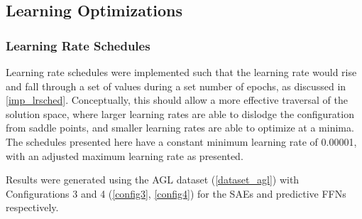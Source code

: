 \documentclass[a4paper,latin]{paper}
\begin{document}



\subsection{Learning Optimizations}

\subsubsection{Learning Rate Schedules}

Learning rate schedules were implemented such that the learning rate would rise and fall through a set of values during a set number of epochs, as discussed in \ref{imp_lrsched}.	Conceptually, this should allow a more effective traversal of the solution space, where larger learning rates are able to dislodge the configuration from saddle points, and smaller learning rates are able to optimize at a minima. The schedules presented here have a constant minimum learning rate of 0.00001, with an adjusted maximum learning rate as presented. \newline

Results were generated using the AGL dataset (\ref{dataset_agl}) with Configurations 3 and 4 (\ref{config3}, \ref{config4}) for the SAEs and predictive FFNs respectively.
\end{document}

